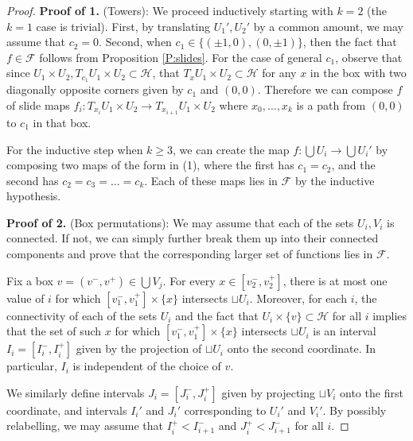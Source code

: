 \documentclass[aop, preprint]{imsart}
\theoremstyle{plain}
\theoremstyle{definition}
\theoremstyle{plain}
\newcommand{\sset}{\subset}
\newcommand{\scrH}{\mathcal{H}}
\newcommand{\scrF}{\mathcal{F}}
\newcommand{\X}{\times}
\begin{document}
\begin{proof}
	\textbf{Proof of 1.} (Towers):  \qquad We proceed inductively starting with $k = 2$ (the $k=1$ case is trivial). First, by translating $U_1', U_2'$ by a common amount, we may assume that $c_2 = 0$. Second, when $c_1 \in \{(\pm 1, 0), (0, \pm 1)\}$, then the fact that $f \in \scrF$ follows from Proposition \ref{P:slides}. For the case of general $c_1$, observe that since $U_1 \X U_2, T_{c_1} U_1 \X U_2 \sset \scrH$, that $T_x U_1 \X U_2 \sset \scrH$ for any $x$ in the box with two diagonally opposite corners given by $c_1$ and $(0, 0)$. Therefore we can compose $f$ of slide maps $f_i:T_{x_i} U_1 \X U_2 \to T_{x_{i+1}} U_1 \X U_2$ where $x_0, \dots, x_k$ is a path from $(0, 0)$ to $c_1$ in that box.
	
	For the inductive step when $k \ge 3$, we can create the map $f:\bigcup U_i \to \bigcup U_i'$ by composing two maps of the form in (1), where the first has $c_1 = c_2$, and the second has $c_2 = c_3 = \dots = c_k$. Each of these maps lies in $\scrF$ by the inductive hypothesis.
	
	\textbf{Proof of 2.} (Box permutations): \qquad  We may assume that each of the sets $U_i, V_i$ is connected. If not, we can simply further break them up into their connected components and prove that the corresponding larger set of functions lies in $\scrF$. 
	
	Fix a box $v = (v^-, v^+) \in \bigcup V_j$. For every $x \in [v^-_2, v^+_2]$, there is at most one value of $i$ for which $[v^-_1, v^+_1] \X \{x\}$ intersects $\sqcup U_i$. Moreover, for each $i$, the connectivity of each of the sets $U_i$ and the fact that $U_i \X \{v\} \sset \scrH$ for all $i$ implies that the set of such $x$ for which  $[v^-_1, v^+_1] \X \{x\}$ intersects $\sqcup U_i$ is an interval $I_i = [I_i^-, I_i^+]$ given by the projection of $\sqcup U_i$ onto the second coordinate. In particular, $I_i$ is independent of the choice of $v$.
	
	We similarly define intervals $J_i = [J_i^-, J_i^+]$ given by projecting $\sqcup V_i$ onto the first coordinate, and intervals $I_i'$ and $J_i'$ corresponding to $U_i'$ and $V_i'$. By possibly relabelling, we may assume that $I_i^+ < I^-_{i+1}$ and $J_i^+ < J^-_{i+1}$ for all $i$.
	

\end{proof}
\end{document}
